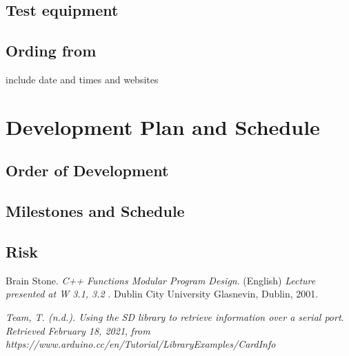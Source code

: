 \documentclass[11pt]{article}
\begin{document}
\subsection{Test equipment}


\subsection{Ording from}
include date and times and websites

\section{Development Plan and Schedule}
\subsection{Order of Development}
\subsection{Milestones and Schedule}
\subsection{Risk}

\begin{thebibliography}{2}
Brain Stone. 
\textit{C++ Functions Modular Program Design}. (English) 
\textit{ Lecture presented at W 3.1, 3.2 }. 
Dublin City University Glasnevin, Dublin, 2001.

\textit{Team, T. (n.d.). Using the SD library to retrieve information over a serial port}.
\textit{ Retrieved February 18, 2021}, 
\textit{from https://www.arduino.cc/en/Tutorial/LibraryExamples/CardInfo}

\end{thebibliography}
\end{document}
